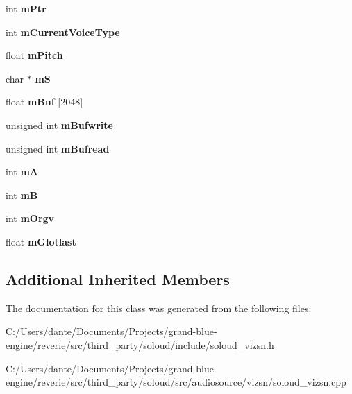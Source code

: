 \begin{DoxyCompactItemize}
int {\bfseries m\+Ptr}
\item 
\mbox{\label{class_so_loud_1_1_vizsn_instance_a640c04b88e800dae9a2598edd4735b9d}} 
int {\bfseries m\+Current\+Voice\+Type}
\item 
\mbox{\label{class_so_loud_1_1_vizsn_instance_a9175f0fddd4852df9db4150b8e287e7c}} 
float {\bfseries m\+Pitch}
\item 
\mbox{\label{class_so_loud_1_1_vizsn_instance_abceab99283f213871a42c53a204b4b2c}} 
char $\ast$ {\bfseries mS}
\item 
\mbox{\label{class_so_loud_1_1_vizsn_instance_a6fa5296064bf18ab2600923fd629c0a1}} 
float {\bfseries m\+Buf} \mbox{[}2048\mbox{]}
\item 
\mbox{\label{class_so_loud_1_1_vizsn_instance_a2c94013bcf88771bab8bb50ef875fc03}} 
unsigned int {\bfseries m\+Bufwrite}
\item 
\mbox{\label{class_so_loud_1_1_vizsn_instance_ad73ca635bcdeec83b28406d2de0fe2ad}} 
unsigned int {\bfseries m\+Bufread}
\item 
\mbox{\label{class_so_loud_1_1_vizsn_instance_a86d027cf9c243ed128cce6923d1d6ec3}} 
int {\bfseries mA}
\item 
\mbox{\label{class_so_loud_1_1_vizsn_instance_a243306baecbc569ca5f6cd8182885411}} 
int {\bfseries mB}
\item 
\mbox{\label{class_so_loud_1_1_vizsn_instance_a7cab4a2845aca41226ab64e462d26dd2}} 
int {\bfseries m\+Orgv}
\item 
\mbox{\label{class_so_loud_1_1_vizsn_instance_ae47ae1264d4ae53d19a29f6b5bc0b8ce}} 
float {\bfseries m\+Glotlast}
\end{DoxyCompactItemize}
\subsection*{Additional Inherited Members}


The documentation for this class was generated from the following files\+:\begin{DoxyCompactItemize}
\item 
C\+:/\+Users/dante/\+Documents/\+Projects/grand-\/blue-\/engine/reverie/src/third\+\_\+party/soloud/include/soloud\+\_\+vizsn.\+h\item 
C\+:/\+Users/dante/\+Documents/\+Projects/grand-\/blue-\/engine/reverie/src/third\+\_\+party/soloud/src/audiosource/vizsn/soloud\+\_\+vizsn.\+cpp\end{DoxyCompactItemize}
